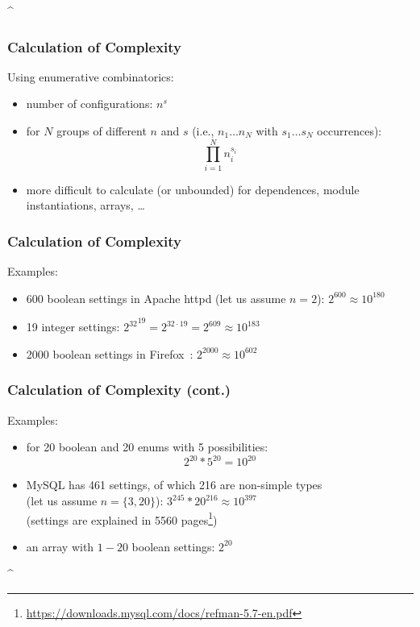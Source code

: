 \lstDeleteShortInline^
\begin{frame}
	\frametitle{Calculation of Complexity}

	Using enumerative combinatorics:
	\begin{itemize}
	\item number of configurations: $n^s$
	\item for $N$ groups of different $n$ and $s$ (i.e., $n_1 \dots n_N$ with $s_1 \dots s_N$ occurrences):  $$\prod_{i=1}^{N} n_i^{s_i}$$
	\item more difficult to calculate (or unbounded) for dependences, module instantiations, arrays, \dots
	\end{itemize}
\end{frame}

\begin{frame}
	\frametitle{Calculation of Complexity}

	Examples:
	\begin{itemize}
	\item 600 boolean settings in Apache httpd (let us assume $n=2$):
	\pause
	$2^{600} \approx 10^{180}$

	\item 19 integer settings:
	\pause
	${2^{32}}^{19} = 2^{32 \cdot 19} = 2^{609} \approx 10^{183}$

	\item 2000 boolean settings in Firefox~\cite{jin2014configurations}:
	\pause
	$2^{2000} \approx 10^{602}$
	\end{itemize}
\end{frame}

\begin{frame}
	\frametitle{Calculation of Complexity (cont.)}

	Examples:
	\begin{itemize}
	\item for 20 boolean and 20 enums with 5 possibilities:
	\pause
	$$2^{20}*5^{20} = 10^{20}$$

	\item MySQL has 461 settings, of which 216 are non-simple types~\cite{xu2015hey} \\ (let us assume $n=\{3,20\}$):
	\pause
	$3^{245} * 20^{216} \approx 10^{397}$ \\
	(settings are explained in 5560 pages\footnote{\url{https://downloads.mysql.com/docs/refman-5.7-en.pdf}})

	\item an array with $1-20$ boolean settings:
	\pause
	$2^{20}$
	\end{itemize}
\end{frame}
\lstMakeShortInline[postbreak=,keywordstyle={}]^


